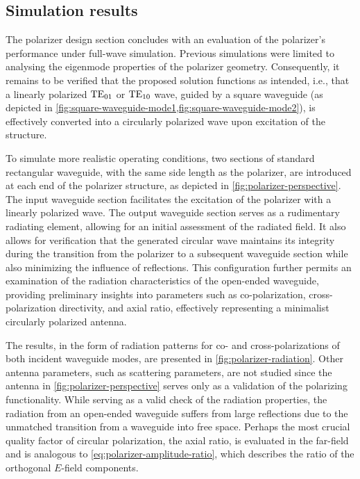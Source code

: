 \documentclass[11pt,a4paper,twoside,openany]{report}
\begin{document}
\subsection{Simulation results}
The polarizer design section concludes with an evaluation of the polarizer's performance under full-wave simulation. Previous simulations were limited to analysing the eigenmode properties of the polarizer geometry. Consequently, it remains to be verified that the proposed solution functions as intended, i.e., that a linearly polarized $\text{TE}_{01}$ or $\text{TE}_{10}$ wave, guided by a square waveguide (as depicted in \cref{fig:square-waveguide-mode1,fig:square-waveguide-mode2}), is effectively converted into a circularly polarized wave upon excitation of the structure.

To simulate more realistic operating conditions, two sections of standard rectangular waveguide, with the same side length as the polarizer, are introduced at each end of the polarizer structure, as depicted in \cref{fig:polarizer-perspective}. The input waveguide section facilitates the excitation of the polarizer with a linearly polarized wave. The output waveguide section serves as a rudimentary radiating element, allowing for an initial assessment of the radiated field. It also allows for verification that the generated circular wave maintains its integrity during the transition from the polarizer to a subsequent waveguide section while also minimizing the influence of reflections. This configuration further permits an examination of the radiation characteristics of the open-ended waveguide, providing preliminary insights into parameters such as co-polarization, cross-polarization directivity, and axial ratio, effectively representing a minimalist circularly polarized antenna.

The results, in the form of radiation patterns for co- and cross-polarizations of both incident waveguide modes, are presented in \cref{fig:polarizer-radiation}. Other antenna parameters, such as scattering parameters, are not studied since the antenna in \cref{fig:polarizer-perspective} serves only as a validation of the polarizing functionality. While serving as a valid check of the radiation properties, the radiation from an open-ended waveguide suffers from large reflections due to the unmatched transition from a waveguide into free space. Perhaps the most crucial quality factor of circular polarization, the axial ratio, is evaluated in the far-field and is analogous to \cref{eq:polarizer-amplitude-ratio}, which describes the ratio of the orthogonal $E$-field components.
\end{document}

